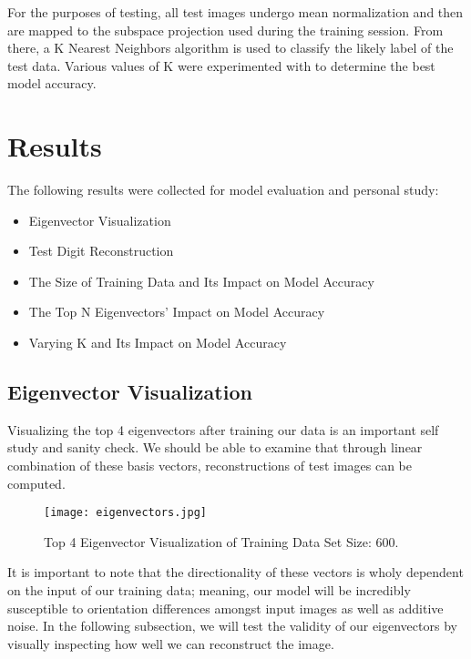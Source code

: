 \documentclass[12pt]{article}
\begin{document}
\bigbreak
\noindent
For the purposes of testing, all test images undergo mean normalization and then are mapped to the subspace projection used during the training session. From there, a K Nearest Neighbors algorithm is used to classify the likely label of the test data. Various values of K were experimented with to determine the best model accuracy. 

\section{Results}

The following results were collected for model evaluation and personal study:

\begin{itemize}
    \item Eigenvector Visualization
    \item Test Digit Reconstruction
    \item The Size of Training Data and Its Impact on Model Accuracy
    \item The Top N Eigenvectors' Impact on Model Accuracy
    \item Varying K and Its Impact on Model Accuracy
\end{itemize}

\subsection{Eigenvector Visualization}

Visualizing the top 4 eigenvectors after training our data is an important self study and sanity check. We should be able to examine that through linear combination of these basis vectors, reconstructions of test images can be computed.

\begin{figure}[h] %
  \centering
  \texttt{[image: eigenvectors.jpg]}
  \caption{Top 4 Eigenvector Visualization of Training Data Set Size: 600.}
\end{figure}

\noindent
It is important to note that the directionality of these vectors is wholy dependent on the input of our training data; meaning, our model will be incredibly susceptible to orientation differences amongst input images as well as additive noise.
\bigbreak
\noindent
In the following subsection, we will test the validity of our eigenvectors by visually inspecting how well we can reconstruct the image. 
\end{document}
